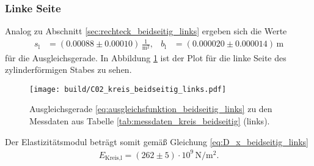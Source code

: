 \subsubsection{Linke Seite}
Analog zu Abschnitt \ref{sec:rechteck_beidseitig_links} ergeben sich die Werte
\begin{align*}
    s_\text{l} &= (\num{0.00088} \pm \num{0.00010}) \, \frac{1}{\unit{\meter^2}}, & 
    b_\text{l} &= (\num{0.000020} \pm \num{0.000014}) \, \unit{\meter}
\end{align*}
für die Ausgleichsgerade.
In Abbildung \ref{fig:plot_kreis_beidseitig_links} ist der Plot für die linke Seite des zylinderförmigen Stabes zu sehen.
%
\begin{figure}[H]
    \centering
    \texttt{[image: build/C02\_kreis\_beidseitig\_links.pdf]}
    \caption{Ausgleichsgerade \eqref{eq:ausgleichsfunktion_beidseitig_links} zu den Messdaten aus Tabelle \ref{tab:messdaten_kreis_beidseitig} (links).}
    \label{fig:plot_kreis_beidseitig_links}
\end{figure}

\noindent
Der Elastizitätsmodul beträgt somit gemäß Gleichung \eqref{eq:D_x_beidseitig_links}
\begin{align}
    E_\text{Kreis,l} = (\num{262} \pm \num{5}) \cdot 10^9 \, \unit{\newton\per\meter^2}.
\end{align}
